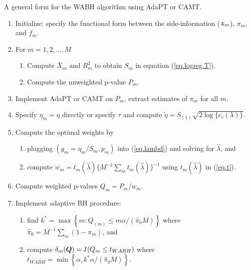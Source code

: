 \documentclass[bimj,fleqn]{w-art}
\newcommand{\Q}{{\mbox{\boldmath $Q$}}}
\newcommand{\mbf}[1]{\mbox{\boldmath${#1}$}}
\theoremstyle{plain}
\theoremstyle{definition}
\begin{document}
\begin{algorithm}[t]
\caption{A general form for the WABH algorithm using AdaPT or CAMT.} \label{wabh.algorithm1}
\begin{enumerate}
    \item Initialize: specify the functional form between the side-information ($\mbf{z}_m$), $\pi_m$, and $f_m$.
    \item For $m=1,2,\ldots,M$ 
    \begin{enumerate}
        \item Compute $\bar X_m$ and $R^2_m$ to obtain $S_m$ in equation (\ref{eq.logreg.T}).
        \item Compute the unweighted p-value $P_m$.
    \end{enumerate}
    \item Implement AdaPT or CAMT on $P_m$, extract estimates of $\pi_m$ for all $m$.
    \item Specify $\eta_m=\eta$ directly or specify $\tau$ and compute $\tilde\eta = S_{(1)}\sqrt{2\log\{c_\tau(\lambda)\}}$. 
    \item Compute the optimal weights by 
    \begin{enumerate}
    \item plugging $(g_m=\eta_m/S_m,p_m)$ into (\ref{eq.lambd}) and solving for $\hat{\lambda}$, and
    \item compute $w_m = t_m(\hat \lambda)\{M^{-1}\sum_m t_m(\hat \lambda)\}^{-1}$ using $t_m(\hat \lambda)$ in (\ref{eq.t}).
    \end{enumerate}
    \item Compute weighted p-values $Q_m = P_m/w_m$.
    \item Implement adaptive BH procedure:
    \begin{enumerate}
    \item find $k^\ast = \max\left\{m: Q_{(m)}\leq m \alpha/(\hat\pi_0 M)\right\}$ where $\hat\pi_0 = M^{-1}\sum_m (1 - \pi_m)$, and 
    \item compute $\delta_m(\Q) = I(Q_m\leq t_{WABH})$ where $t_{WABH} = \min\left\{\alpha, k^\ast \alpha/(\hat\pi_0 M)\right\}$.
    \end{enumerate}
    
\end{enumerate}

\end{algorithm}
\end{document}
